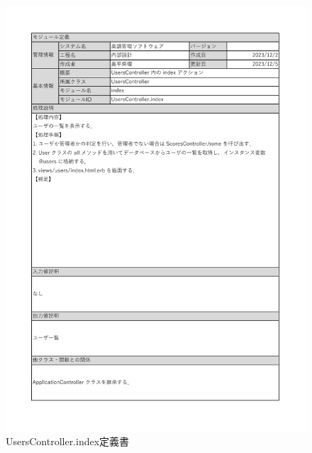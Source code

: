 \begin{figure}
    \centering
    \includegraphics[scale=0.7]{img/Users/xlsx/UsersController_index.pdf}
    \vspace{-1cm}
    \caption{UsersController.index定義書}
\end{figure}

